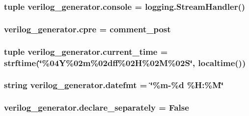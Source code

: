 \hypertarget{namespaceverilog__generator_a734fc03a4db18f8e5c63129ffcda83a9}{
\subsubsection[{console}]{\setlength{\rightskip}{0pt plus 5cm}tuple verilog\-\_\-generator.\-console = logging.\-Stream\-Handler()}}\label{namespaceverilog__generator_a734fc03a4db18f8e5c63129ffcda83a9}
\hypertarget{namespaceverilog__generator_ae3ef6869003c4cba069f0d66aedee089}{
\subsubsection[{cpre}]{\setlength{\rightskip}{0pt plus 5cm}verilog\-\_\-generator.\-cpre = {\bf comment\-\_\-post}}}\label{namespaceverilog__generator_ae3ef6869003c4cba069f0d66aedee089}
\hypertarget{namespaceverilog__generator_ad05f0f3ac407424a9c5a520b2273bc80}{
\subsubsection[{current\-\_\-time}]{\setlength{\rightskip}{0pt plus 5cm}tuple verilog\-\_\-generator.\-current\-\_\-time = strftime(\char`\"{}\%04\-Y\%02m\%02dff\%02\-H\%02\-M\%02\-S\char`\"{}, localtime())}}\label{namespaceverilog__generator_ad05f0f3ac407424a9c5a520b2273bc80}
\hypertarget{namespaceverilog__generator_a017c98333edf5962930aae34c94472d7}{
\subsubsection[{datefmt}]{\setlength{\rightskip}{0pt plus 5cm}string verilog\-\_\-generator.\-datefmt = \char`\"{}\%m-\/\%d \%H\-:\%M\char`\"{}}}\label{namespaceverilog__generator_a017c98333edf5962930aae34c94472d7}
\hypertarget{namespaceverilog__generator_ab6109161297a91e88d4900fd43a8ae7c}{
\subsubsection[{declare\-\_\-separately}]{\setlength{\rightskip}{0pt plus 5cm}verilog\-\_\-generator.\-declare\-\_\-separately = False}}\label{namespaceverilog__generator_ab6109161297a91e88d4900fd43a8ae7c}
